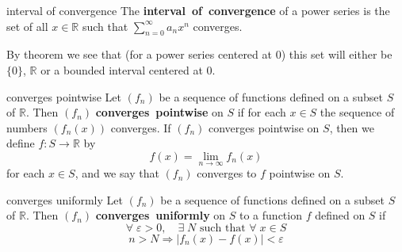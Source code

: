 \documentclass[avery5371,grid]{flashcards}
\newcommand{\R}{\mathbb{R}}
\newcommand{\st}{\textrm{ such that }}
\begin{document}
\begin{flashcard}[Definition]{interval of convergence}
The \mbox{\textbf{interval of convergence}} of a power series is the set
of all $x \in \R$ such that $\displaystyle \sum_{n=0}^{\infty} a_n x^n$
converges.

\medskip
By theorem we see that (for a power series centered at 0) this set will 
either be $\{0\}$, $\R$ or a bounded interval centered at 0.
\end{flashcard}

\begin{flashcard}[Definition]{converges pointwise}
Let $(f_n)$ be a sequence of functions defined on a subset $S$ of $\R$.
Then $(f_n)$ \mbox{\textbf{converges pointwise}} on $S$ if for each
$x \in S$ the sequence of numbers $(f_n(x))$ converges.  If $(f_n)$
converges pointwise on $S$, then we define $f:S \rightarrow \R$ by
\begin{equation*}
f(x) = \lim_{n\rightarrow \infty} f_n(x)
\end{equation*}
for each $x \in S$, and we say that $(f_n)$ converges to $f$ pointwise
on $S$.
\end{flashcard}

\begin{flashcard}[Definition]{converges uniformly}
Let $(f_n)$ be a sequence of functions defined on a subset $S$ of $\R$.
 Then $(f_n)$ \mbox{\textbf{converges uniformly}} on $S$ to a function
$f$ defined on $S$ if
\begin{equation*}
\forall \; \varepsilon > 0, \quad \exists \; N \st \forall \; x \in S
\end{equation*}
\begin{equation*}
n > N \Rightarrow |f_n(x) - f(x)| < \varepsilon
\end{equation*}
\end{flashcard}

\begin{flashcard}[Definition]{}

\end{flashcard}

\begin{flashcard}[Definition]{}

\end{flashcard}

\begin{flashcard}[Definition]{}

\end{flashcard}

\begin{flashcard}[Definition]{}

\end{flashcard}
\end{document}
